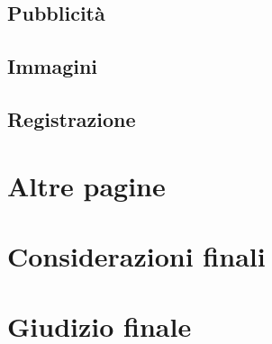 \documentclass[11pt,a4paper]{article}
\begin{document}
\subsection{Pubblicità}
\label{subsec:ads}

\subsection{Immagini}
\label{subsec:images}

\subsection{Registrazione}
\label{subsec:signup}

\section{Altre pagine}
\label{sec:other-pages}

\section{Considerazioni finali}
\label{sec:final-remarks}

\section{Giudizio finale}
\label{sec:final-vote}
\end{document}
